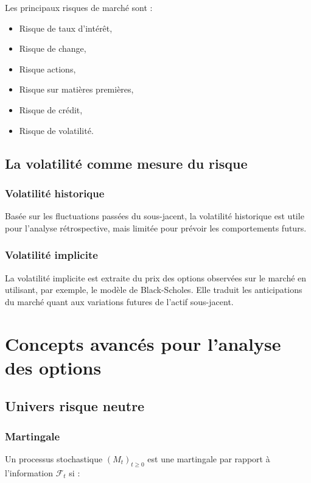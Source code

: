 Les principaux risques de marché sont :

\begin{itemize}
	\item Risque de taux d'intérêt,
	\item Risque de change,
	\item Risque actions,
	\item Risque sur matières premières,
	\item Risque de crédit,
	\item Risque de volatilité.
\end{itemize}

\subsection{La volatilité comme mesure du risque}

\subsubsection{Volatilité historique}
Basée sur les fluctuations passées du sous-jacent, la volatilité historique est utile pour l'analyse rétrospective, mais limitée pour prévoir les comportements futurs.

\subsubsection{Volatilité implicite}
La volatilité implicite est extraite du prix des options observées sur le marché en utilisant, par exemple, le modèle de Black-Scholes. Elle traduit les anticipations du marché quant aux variations futures de l'actif sous-jacent.

\section{Concepts avancés pour l'analyse des options}

\subsection{Univers risque neutre}

\subsubsection{Martingale}
Un processus stochastique $(M_t)_{t \geq 0}$ est une martingale par rapport à l'information $\mathcal{F}_t$ si :

